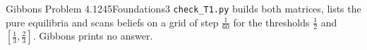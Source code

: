 \begin{exsol}{Gibbons Problem 4.1}{245}{Foundations}{3}
\verify \texttt{check\_T1.py} builds both matrices, lists the pure equilibria and scans beliefs
on a grid of step $\frac1{60}$ for the thresholds $\frac12$ and $[\frac13, \frac23]$. Gibbons prints no
answer.

\end{exsol}
